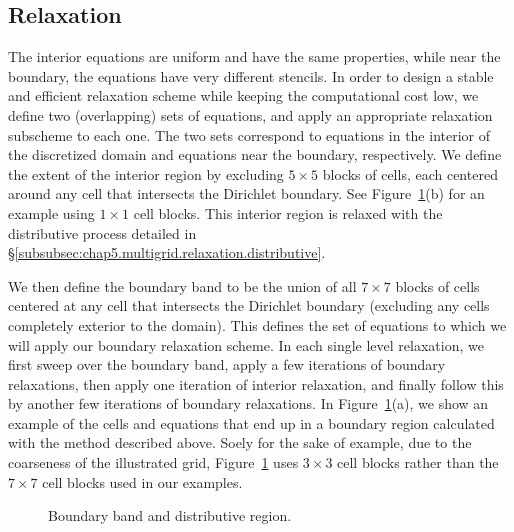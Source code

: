 \subsection{Relaxation}

The interior equations are uniform and have the same properties, while near the boundary, the equations have very different stencils. In order to design a stable and efficient relaxation scheme while keeping the computational cost low, we define two (overlapping) sets of equations, and apply an appropriate relaxation subscheme to each one. The two sets correspond to equations in the interior of the discretized domain and equations near the boundary, respectively. We define the extent of the interior region by excluding $5 \times 5$ blocks of cells, each centered around any cell that intersects the Dirichlet boundary. See Figure~\ref{fig:chap5.boundaryband}(b) for an example using $1 \times 1$ cell blocks. This interior region is relaxed with the distributive process detailed in \S\ref{subsubsec:chap5.multigrid.relaxation.distributive}.

We then define the boundary band to be the union of all $7 \times 7$ blocks of cells centered at any cell that intersects the Dirichlet boundary (excluding any cells completely exterior to the domain). This defines the set of equations to which we will apply our boundary relaxation scheme. In each single level relaxation, we first sweep over the boundary band, apply a few iterations of boundary relaxations, then apply one iteration of interior relaxation, and finally follow this by another few iterations of boundary relaxations. In Figure~\ref{fig:chap5.boundaryband}(a), we show an example of the cells and equations that end up in a boundary region calculated with the method described above. Soely for the sake of example, due to the coarseness of the illustrated grid, Figure~\ref{fig:chap5.boundaryband} uses $3 \times 3$ cell blocks rather than the $7 \times 7$ cell blocks used in our examples.

\setlength{\figurewidth}{0.50\textwidth}
\begin{figure}[htb]
\centering
{}
\caption{Boundary band and distributive region.}
\label{fig:chap5.boundaryband}
\end{figure}

